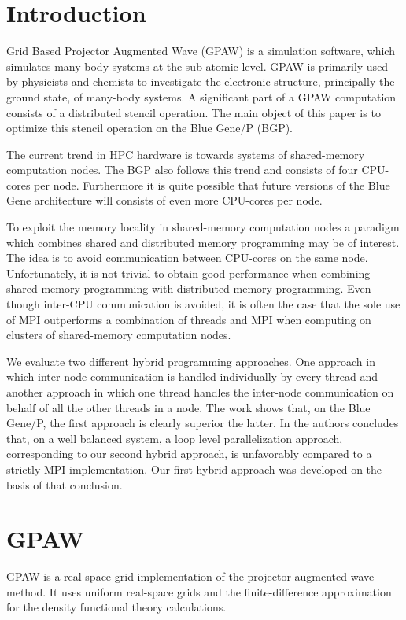 \documentclass[preprint,3p,times,twocolumn]{elsarticle}
\begin{document}

\section{Introduction}
Grid Based Projector Augmented Wave (GPAW)\cite{Mortensen05} is a simulation software, which simulates many-body systems at the sub-atomic level. GPAW is primarily used by physicists and chemists to investigate the electronic structure, principally the ground state, of many-body systems. A significant part of a GPAW computation consists of a distributed stencil operation. The main object of this paper is to optimize this stencil operation on the Blue Gene/P\cite{BGPoverview} (BGP).

The current trend in HPC hardware is towards systems of shared-memory computation nodes. The BGP also follows this trend and consists of four CPU-cores per node. Furthermore it is quite possible that future versions of the Blue Gene architecture will consists of even more CPU-cores per node.

To exploit the memory locality in shared-memory computation nodes a paradigm which combines shared and distributed memory programming may be of interest. The idea is to avoid communication between CPU-cores on the same node. Unfortunately, it is not trivial to obtain good performance when combining shared-memory programming with distributed memory programming. Even though inter-CPU communication is avoided, it is often the case that the sole use of MPI\cite{mpi} outperforms a combination of threads and MPI when computing on clusters of shared-memory computation nodes\cite{henty2000, hipp04Hybrid, VinterB}.

We evaluate two different hybrid programming approaches. One approach in which inter-node communication is handled individually by every thread and another approach in which one thread handles the inter-node communication on behalf of all the other threads in a node. The work shows that, on the Blue Gene/P, the first approach is clearly superior the latter. In \cite{Cappello2000} the authors concludes that, on a well balanced system, a loop level parallelization approach, corresponding to our second hybrid approach, is unfavorably compared to a strictly MPI implementation. Our first hybrid approach was developed on the basis of that conclusion.

\section{GPAW}
GPAW is a real-space grid implementation of the projector augmented wave method\cite{paw}. It uses uniform real-space grids and the finite-difference approximation for the density functional theory calculations.
\end{document}
